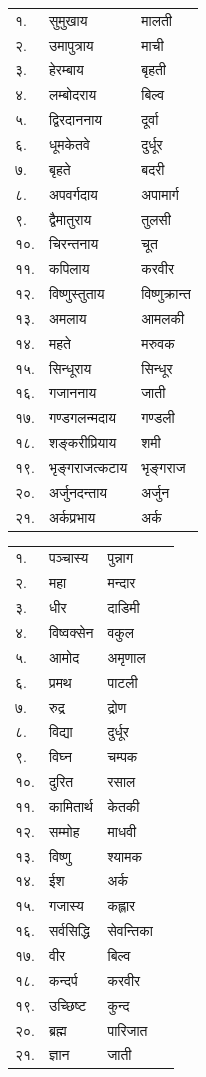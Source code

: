 \begin{center}
\begin{longtable}{ll@{~नमः — }l@{-पत्रं समर्पयामि}}
    १. & सुमुखाय & मालती\\
    २. & उमापुत्राय & माची\\
    ३. & हेरम्बाय & बृहती\\
    ४. & लम्बोदराय & बिल्व\\
    ५. & द्विरदाननाय & दूर्वा\\
    ६. & धूमकेतवे & दुर्धूर\\
    ७. & बृहते & बदरी\\
    ८. & अपवर्गदाय & अपामार्ग\\
    ९. & द्वैमातुराय & तुलसी\\
    १०. & चिरन्तनाय & चूत\\
    ११. & कपिलाय & करवीर\\
    १२. & विष्णुस्तुताय & विष्णुक्रान्त\\
    १३. & अमलाय & आमलकी\\
    १४. & महते & मरुवक\\
    १५. & सिन्धूराय & सिन्धूर\\
    १६. & गजाननाय & जाती\\
    १७. & गण्डगलन्मदाय & गण्डली\\
    १८. & शङ्करीप्रियाय & शमी\\
    १९. & भृङ्गराजत्कटाय & भृङ्गराज\\
    २०. & अर्जुनदन्ताय & अर्जुन\\
    २१. & अर्कप्रभाय & अर्क\\
\end{longtable}

\begin{longtable}{ll@{-गणपतये नमः — }ll@{-पुष्पं समर्पयामि}}
    १. & पञ्चास्य & पुन्नाग&\\
    २. & महा & मन्दार&\\
    ३. & धीर & दाडिमी&\\
    ४. & विष्वक्सेन & वकुल&\\
    ५. & आमोद & अमृणाल&\\
    ६. & प्रमथ & पाटली&\\
    ७. & रुद्र & द्रोण&\\
    ८. & विद्या & दुर्धूर&\\
    ९. & विघ्न & चम्पक&\\
    १०. & दुरित & रसाल&\\
    ११. & कामितार्थ & केतकी&\\
    १२. & सम्मोह & माधवी&\\
    १३. & विष्णु & श्यामक&\\
    १४. & ईश & अर्क&\\
    १५. & गजास्य & कह्लार&\\
    १६. & सर्वसिद्धि & सेवन्तिका&\\
    १७. & वीर & बिल्व&\\
    १८. & कन्दर्प & करवीर&\\
    १९. & उच्छिष्ट & कुन्द&\\
    २०. & ब्रह्म & पारिजात&\\
    २१. & ज्ञान & जाती&\\
\end{longtable}


\end{center}
